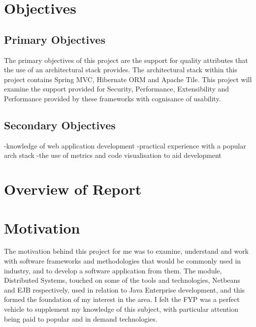 \section{Objectives}

\subsection{Primary Objectives}

The primary objectives of this project are the support for quality attributes that the use of an architectural stack provides. The architectural stack within this project contains Spring MVC, Hibernate ORM and Apache Tile. This project will examine the support provided for Security, Performance, Extensibility and Performance provided by these frameworks with cognisance of usability. 

\subsection{Secondary Objectives}

-knowledge of web application development
-practical experience with a popular arch stack
-the use of metrics and code visualisation to aid development

\section{Overview of Report}



\section{Motivation}

The motivation behind this project for me was to examine, understand and work with software frameworks and methodologies that would be commonly used in industry, and to develop a software application from them. The module, Distributed Systems, touched on some of the tools and technologies, Netbeans and EJB respectively, used in relation to Java Enterprise development, and this formed the foundation of my interest in the area. I felt the FYP was a perfect vehicle to supplement my knowledge of this subject, with particular attention being paid to popular and in demand technologies. 

